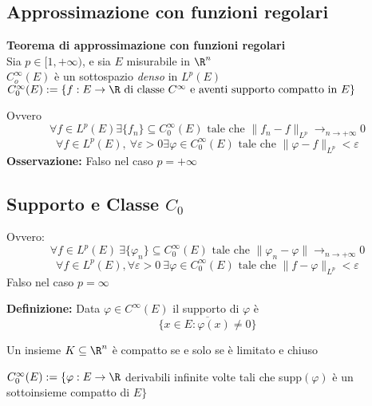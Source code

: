 \subsection{Approssimazione con funzioni regolari}
\begin{tcolorbox}
	\textbf{Teorema di approssimazione con funzioni regolari}\\
	Sia $p\in[1,+\infty)$, e sia $E$ misurabile in $\R^n$
	\\$C_o^\infty(E)$ è un sottospazio \textit{denso} in $L^p(E)$
	\\$C_0^\infty(E):=\{f:E\to \R\text{ di classe }C^\infty \text{ e aventi supporto compatto in }E\}$ 
\end{tcolorbox}
Ovvero 
\[\forall f\in L^p(E) \exists \{f_n\} \subseteq C_0^\infty(E)\text{ tale che }\|f_n-f\|_{L^p}\to_{n\to +\infty}0\]
\[\forall f\in L^p(E),\ \forall \varepsilon>0 \exists \varphi\in C_0^\infty(E)\text{ tale che }\|\varphi-f\|_{L^p}<\varepsilon\]
\textbf{Osservazione:} Falso nel caso $p=+\infty$



\subsection{Supporto e Classe $C_0$}
Ovvero:
\[\forall f \in L^{p}(E)\ \exists \{ \varphi_n\}	\subseteq  C_0^\infty(E) \text{ tale che } \|\varphi_n -\varphi\|\to _{n\to +\infty}0\]
\[\forall f\in L^{p}(E),\forall \varepsilon>0\ \exists \varphi\in C_0^\infty(E)\text{ tale che }\|f-\varphi\|_{L^{p}}<\varepsilon
\] 
Falso nel caso $p=\infty$
\begin{tcolorbox}
	\textbf{Definizione:} Data $\varphi\in C^\infty(E)$ il supporto di $\varphi$ è 
	\[\overline{\{x\in E:\varphi(x)\neq 0\}} \]
\end{tcolorbox}
\begin{tcolorbox}
	Un insieme $K\subseteq  \R^n$ è compatto se e solo se è limitato e chiuso
\end{tcolorbox}
\begin{tcolorbox}
	$C_0^\infty(E):=\{\varphi :E\to \R$ derivabili infinite volte tali che supp$(\varphi)$ è un sottoinsieme compatto di $E\} $
\end{tcolorbox}
